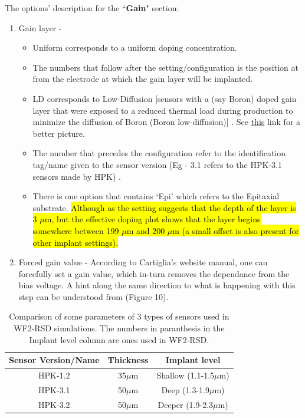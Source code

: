 \documentclass[11pt]{article}
\newcommand{\hlyellow}[1]{{\sethlcolor{yellow}\hl{#1}}}
\begin{document}
\newpage
The options' description for the ``\textbf{Gain}" section:
\begin{enumerate}
    \item Gain layer - 
        \begin{itemize}
            \item Uniform corresponds to a uniform doping concentration. 
            \item The numbers that follow after the setting/configuration is the position at from the electrode at which the gain layer will be implanted. 
            \item LD corresponds to Low-Diffusion [sensors with a (say Boron) doped gain layer that were exposed to a reduced thermal load during production to minimize the diffusion of Boron (Boron low-diffusion)] \cite{ferrero-radiation-hardness}. See \href{https://indico.cern.ch/event/806731/contributions/3516709/attachments/1926118/3188326/191013-VERTEX-RD50-mmoll-acceptor-removal.pdf}{this} link for a better picture.
            \item The number that precedes the configuration refer to the identification tag/name given to the sensor version (Eg - 3.1 refers to the HPK-3.1 sensors made by HPK) \cite{jadhav-sensor-variation, jin-sensor-variation}.
            \item There is one option that contains `Epi' which refers to the Epitaxial substrate. \hlyellow{Although as the setting suggests that the depth of the layer is 3 $\mu$m, but the effective doping plot shows that the layer begins somewhere between 199 $\mu$m and 200 $\mu$m (a small offset is also present for other implant settings).}
        \end{itemize}
    \item Forced gain value - According to Cartiglia's website manual, one can forcefully set a gain value, which in-turn removes the dependance from the bias voltage. A hint along the same direction to what is happening with this step can be understood from \cite{ferrero-radiation-hardness} (Figure 10).
\end{enumerate}
\begin{table}[!h]
    \centering
    \begin{tabular}{|c|c|c|}
        \hline
        Sensor Version/Name & Thickness & Implant level        \\ \hline
        HPK-1.2             & 35$\mu$m & Shallow (1.1-1.5$\mu$m) \\ \hline
        HPK-3.1             & 50$\mu$m & Deep (1.3-1.9$\mu$m)    \\ \hline
        HPK-3.2             & 50$\mu$m & Deeper (1.9-2.3$\mu$m)    \\ \hline
    \end{tabular}
    \caption{Comparison of some parameters of 3 types of sensors used in WF2-RSD simulations. The numbers in paranthesis in the Implant level column are ones used in WF2-RSD.}
    \label{tab:hpk-sensor-parameters}
\end{table}
\end{document}
